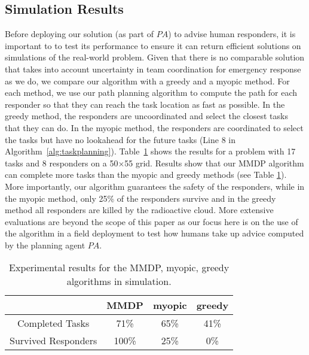 \subsection{Simulation Results}



\noindent Before deploying our solution (as part of $PA$) to advise human responders, it is important to 
to test its performance to ensure it can return efficient solutions on simulations of the real-world problem. Given that there is no
comparable solution that takes into account uncertainty in team coordination for emergency response as we do,
we compare our algorithm with a greedy and a myopic method.
For each method, we use our path planning algorithm to compute the
path for each responder so that they can reach the task location as
fast as possible. In the greedy method, the responders are
uncoordinated and select the closest tasks that they can do. In the
myopic method, the responders are coordinated to select the tasks
but have no lookahead for the future tasks (Line 8 in
Algorithm~\ref{alg:taskplanning}). Table~\ref{tab:simulation} shows
the results for a problem with 17 tasks and 8 responders on a
50$\times$55 grid. Results show that our MMDP algorithm can complete
more tasks than the myopic and greedy methods (see Table \ref{tab:simulation}). More importantly,
our algorithm guarantees the safety of the responders, while in the
myopic method, only 25\% of the responders survive and in the
greedy method all responders are killed by the radioactive cloud.
More extensive evaluations are beyond the scope of this paper as
our focus here is on the use of the algorithm in a field deployment
to test how humans take up advice computed by the planning agent $PA$.
\begin{table}[htbp]
  \centering
  \caption{Experimental results for the MMDP, myopic, greedy
  algorithms in simulation.}
  \begin{tabular}{c|c|c|c}
   & MMDP & myopic & greedy \\
  \hline
  Completed Tasks & 71\% & 65\% & 41\% \\
  \hline
  Survived Responders & 100\% & 25\% & 0\% \\
  \end{tabular}
  \label{tab:simulation}\vspace{-3mm}
\end{table}
